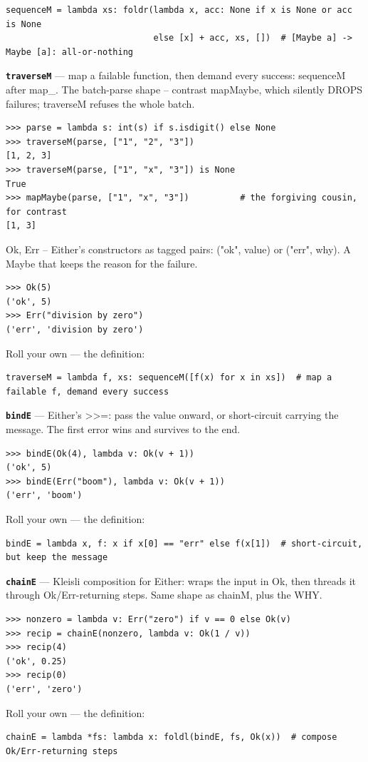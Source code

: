 \documentclass[10pt,letterpaper]{article}
\begin{document}
\begin{lstlisting}[style=ex]
sequenceM = lambda xs: foldr(lambda x, acc: None if x is None or acc is None
                             else [x] + acc, xs, [])  # [Maybe a] -> Maybe [a]: all-or-nothing
\end{lstlisting}
\textbf{\texttt{traverseM}} --- map a failable function, then demand every success: sequenceM after map\_. The batch-parse shape -- contrast mapMaybe, which silently DROPS failures; traverseM refuses the whole batch.
\begin{lstlisting}[style=ex]
>>> parse = lambda s: int(s) if s.isdigit() else None
>>> traverseM(parse, ["1", "2", "3"])
[1, 2, 3]
>>> traverseM(parse, ["1", "x", "3"]) is None
True
>>> mapMaybe(parse, ["1", "x", "3"])          # the forgiving cousin, for contrast
[1, 3]
\end{lstlisting}

Ok, Err -- Either's constructors as tagged pairs: ("ok", value) or ("err", why). A Maybe that keeps the reason for the failure.

\begin{lstlisting}[style=ex]
>>> Ok(5)
('ok', 5)
>>> Err("division by zero")
('err', 'division by zero')
\end{lstlisting}

Roll your own --- the definition:

\begin{lstlisting}[style=ex]
traverseM = lambda f, xs: sequenceM([f(x) for x in xs])  # map a failable f, demand every success
\end{lstlisting}
\textbf{\texttt{bindE}} --- Either's >>=: pass the value onward, or short-circuit carrying the message. The first error wins and survives to the end.
\begin{lstlisting}[style=ex]
>>> bindE(Ok(4), lambda v: Ok(v + 1))
('ok', 5)
>>> bindE(Err("boom"), lambda v: Ok(v + 1))
('err', 'boom')
\end{lstlisting}

Roll your own --- the definition:

\begin{lstlisting}[style=ex]
bindE = lambda x, f: x if x[0] == "err" else f(x[1])  # short-circuit, but keep the message
\end{lstlisting}
\textbf{\texttt{chainE}} --- Kleisli composition for Either: wraps the input in Ok, then threads it through Ok/Err-returning steps. Same shape as chainM, plus the WHY.
\begin{lstlisting}[style=ex]
>>> nonzero = lambda v: Err("zero") if v == 0 else Ok(v)
>>> recip = chainE(nonzero, lambda v: Ok(1 / v))
>>> recip(4)
('ok', 0.25)
>>> recip(0)
('err', 'zero')
\end{lstlisting}

Roll your own --- the definition:

\begin{lstlisting}[style=ex]
chainE = lambda *fs: lambda x: foldl(bindE, fs, Ok(x))  # compose Ok/Err-returning steps
\end{lstlisting}
\end{document}
